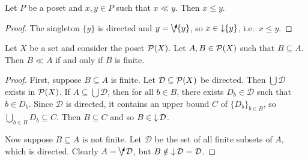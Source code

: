 \begin{lemma} \label{wayBelowImpliesLessThan}
Let $P$ be a poset and $x,y\in P$ such that $x\ll y$. Then $x\leq y$.
\end{lemma}
\begin{proof}
The singleton $\{y\}$ is directed and $y = \dirvee \{y\}$, so $x\in \operatorname{\downarrow}\{y\}$, i.e.\ $x\leq y$.
\end{proof}

\begin{lemma}
Let $X$ be a set and consider the poset $\operatorname{\mathcal{P}}(X)$. Let $A,B\in\operatorname{\mathcal{P}}(X)$ such that $B\subseteq A$. Then $B \ll A$ \textup{if and only if} $B$ is finite.
\end{lemma}
\begin{proof}
First, suppose $B\subseteq A$ is finite. Let $\mathcal{D}\subseteq \operatorname{\mathcal{P}}(X)$ be directed. Then $\bigcup \mathcal{D}$ exists in $\operatorname{\mathcal{P}}(X)$. If $A\subseteq \bigcup \mathcal{D}$, then for all $b\in B$, there exists $D_b\in \mathcal{D}$ such that $b\in D_b$. Since $\mathcal{D}$ is directed, it contains an upper bound $C$ of $\{D_b\}_{b\in B}$, so $\bigcup_{b\in B}D_b \subseteq C$. Then $B\subseteq C$ and so $B\in \operatorname{\downarrow} \mathcal{D}$.

Now suppose $B\subseteq A$ is not finite. Let $\mathcal{D}$ be the set of all finite subsets of $A$, which is directed. Clearly $A = \dirvee \mathcal{D}$, but $B\notin \operatorname{\downarrow} \mathcal{D} = \mathcal{D}$.
\end{proof}

